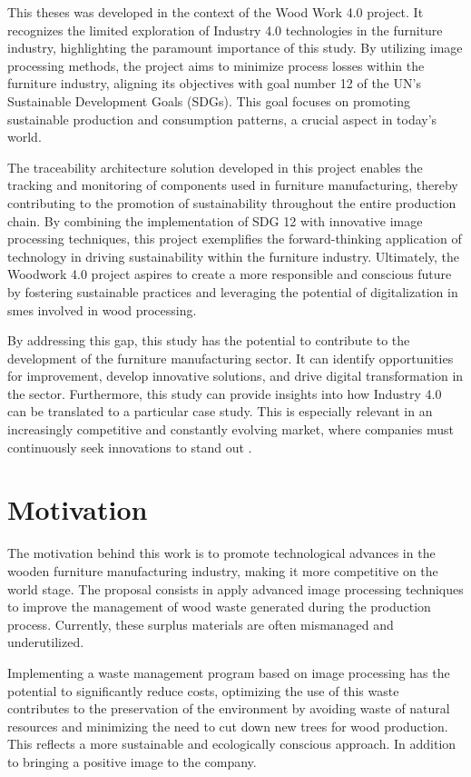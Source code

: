This theses was developed in the context of the Wood Work 4.0 project. It recognizes the limited exploration of Industry 4.0 technologies in the furniture industry, highlighting the paramount importance of this study. By utilizing image processing methods, the project aims to minimize process losses within the furniture industry, aligning its objectives with goal number 12 of the UN's Sustainable Development Goals (SDGs). This goal focuses on promoting sustainable production and consumption patterns, a crucial aspect in today's world.

The traceability architecture solution developed in this project enables the tracking and monitoring of components used in furniture manufacturing, thereby contributing to the promotion of sustainability throughout the entire production chain. By combining the implementation of SDG 12 with innovative image processing techniques, this project exemplifies the forward-thinking application of technology in driving sustainability within the furniture industry. Ultimately, the Woodwork 4.0 project aspires to create a more responsible and conscious future by fostering sustainable practices and leveraging the potential of digitalization in \acrshort{smes} involved in wood processing.

By addressing this gap, this study has the potential to contribute to the development of the furniture manufacturing sector. It can identify opportunities for improvement, develop innovative solutions, and drive digital transformation in the sector. Furthermore, this study can provide insights into how Industry 4.0 can be translated to a particular case study. This is especially relevant in an increasingly competitive and constantly evolving market, where companies must continuously seek innovations to stand out \cite{ghobakhloo2021industry}.


\section{Motivation}\label{cap:intro:justification}

The motivation behind this work is to promote technological advances in the wooden furniture manufacturing industry, making it more competitive on the world stage. The proposal consists in apply advanced image processing techniques to improve the management of wood waste generated during the production process. Currently, these surplus materials are often mismanaged and underutilized.

Implementing a waste management program based on image processing has the potential  to significantly reduce costs, optimizing the use of this waste contributes to the preservation of the environment by avoiding waste of natural resources and minimizing the need to cut down new trees for wood production. This reflects a more sustainable and ecologically conscious approach. In addition to bringing a positive image to the company.


